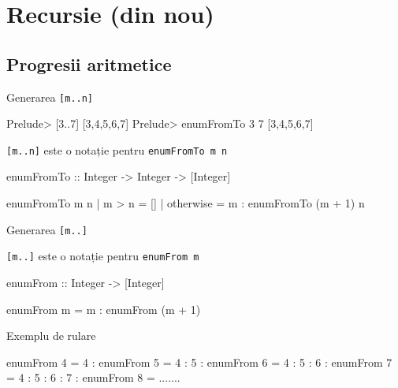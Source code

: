 \documentclass[handout,xcolor=pdftex,romanian,colorlinks]{beamer}
\begin{document}
\section{Recursie (din nou)}
\subsection{Progresii aritmetice}
\begin{frame}[fragile]{Generarea \lstinline$[m..n]$}
\begin{asciihs}
Prelude> [3..7]
[3,4,5,6,7]
Prelude> enumFromTo 3 7
[3,4,5,6,7]
\end{asciihs}

\lstinline$[m..n]$ este o notație pentru  \lstinline$enumFromTo m n$
\begin{asciihs}
enumFromTo :: Integer -> Integer -> [Integer]
\end{asciihs}
\vspace{-2ex}
\begin{asciihs}
enumFromTo m n | m > n     = []
               | otherwise = m : enumFromTo (m + 1) n
\end{asciihs}
\end{frame}

\begin{frame}[fragile]{Generarea \lstinline$[m..]$}

\lstinline$[m..]$ este o notație pentru  \lstinline$enumFrom m$
\begin{asciihs}
enumFrom :: Integer -> [Integer]
\end{asciihs}
\vspace{-2ex}
\begin{asciihs}
enumFrom m = m : enumFrom (m + 1)
\end{asciihs}

\begin{block}{Exemplu de rulare}
\begin{asciihs}
enumFrom 4 
  = 4 : enumFrom 5
  = 4 : 5 : enumFrom 6
  = 4 : 5 : 6 : enumFrom 7
  = 4 : 5 : 6 : 7 : enumFrom 8 
  = .......
\end{asciihs}
\end{block}
\end{frame}
\end{document}
